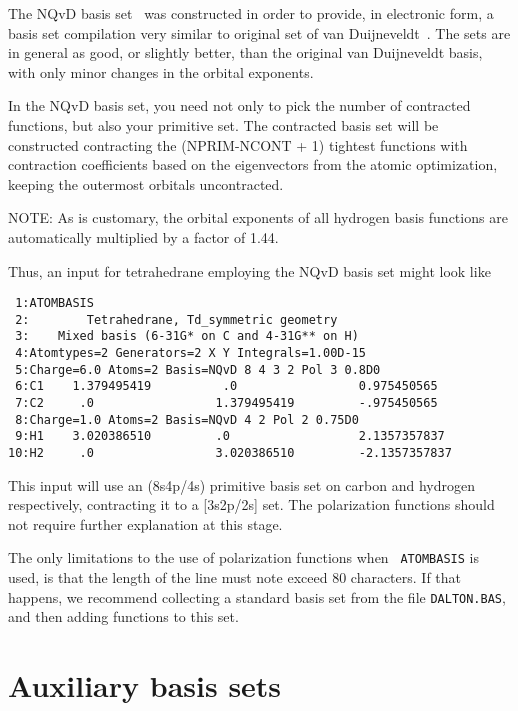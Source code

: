 The NQvD basis set~\cite{nqvdref} was constructed in order to provide,
in electronic form, a basis set compilation very similar to original
set of van Duijneveldt~\cite{fbvdibmrap}.
The sets are in general as good, or slightly better, than the original
van Duijneveldt basis, with only minor changes in the orbital
exponents.

In the NQvD basis set, you need not only to pick the number of
contracted functions, but also your primitive set. The contracted
basis set will be constructed contracting the (NPRIM-NCONT + 1)
tightest functions with contraction coefficients based on the
eigenvectors from the atomic optimization, keeping the outermost
orbitals uncontracted.

NOTE: As is customary, the orbital exponents of all hydrogen basis
functions are automatically multiplied by a factor of 1.44.

Thus, an input for tetrahedrane employing the NQvD basis set might
look like

\begin{verbatim}
 1:ATOMBASIS
 2:        Tetrahedrane, Td_symmetric geometry
 3:    Mixed basis (6-31G* on C and 4-31G** on H)
 4:Atomtypes=2 Generators=2 X Y Integrals=1.00D-15
 5:Charge=6.0 Atoms=2 Basis=NQvD 8 4 3 2 Pol 3 0.8D0
 6:C1    1.379495419          .0                 0.975450565
 7:C2     .0                 1.379495419         -.975450565
 8:Charge=1.0 Atoms=2 Basis=NQvD 4 2 Pol 2 0.75D0
 9:H1    3.020386510         .0                  2.1357357837
10:H2     .0                 3.020386510         -2.1357357837
\end{verbatim}

This input will use an (8s4p/4s) primitive basis set on carbon and
hydrogen respectively, contracting it to a [3s2p/2s] set. The
polarization functions should not require further explanation at this
stage.

The only limitations to the use of polarization functions when {\tt
ATOMBASIS} is used, is that the length of the line must note exceed 80
characters. If that happens, we recommend collecting a standard basis set
from the file \verb|DALTON.BAS|, and then adding
functions to this set.

\section{Auxiliary basis sets}
\label{sec:r12aux}

